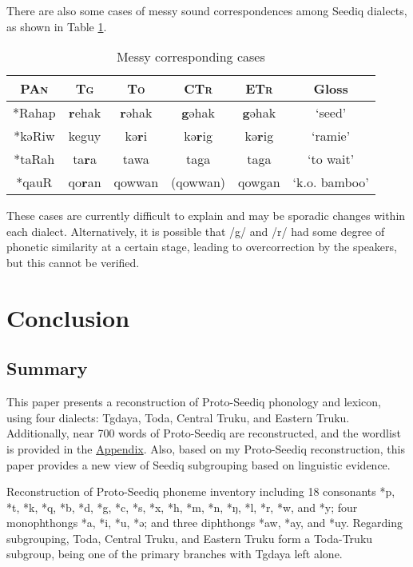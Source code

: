 \documentclass[12pt]{article}
\newcommand{\pan}{\textsc{PAn}\xspace}
\newcommand{\psedf}{Proto-Seediq\xspace}
\newcommand{\stg}{\textsc{Tg}\xspace}
\newcommand{\stgf}{Tgdaya\xspace}
\newcommand{\totrf}{Toda-Truku\xspace}
\newcommand{\sto}{\textsc{To}\xspace}
\newcommand{\stof}{Toda\xspace}
\newcommand{\sctr}{\textsc{CTr}\xspace}
\newcommand{\sctrf}{Central Truku\xspace}
\newcommand{\setr}{\textsc{ETr}\xspace}
\newcommand{\setrf}{Eastern Truku\xspace}
\begin{document}
There are also some cases of messy sound correspondences among Seediq dialects, as shown in Table \ref{tab:gr3}.

\begin{table}[!htbp]
\centering
\caption{Messy corresponding cases}
\label{tab:gr3}
\begin{tabular}{cccccc}
\hline
\pan   &  \stg  & \sto   & \sctr    & \setr  & Gloss         \\ \hline
*Rahap &  \textbf{r}ehak & \textbf{r}əhak  & \textbf{g}əhak    & \textbf{g}əhak  & `seed'        \\
*kəRiw &  keguy & kə\textbf{r}i   & kə\textbf{r}ig    & kə\textbf{r}ig  & `ramie'       \\
*taRah &  ta\textbf{r}a  & tawa   & taga     & taga   & `to wait'     \\
*qauR  &  qo\textbf{r}an & qowwan & (qowwan) & qowgan & `k.o. bamboo' \\ \hline
\end{tabular}
\end{table}

These cases are currently difficult to explain and may be sporadic changes within each dialect. Alternatively, it is possible that /g/ and /r/ had some degree of phonetic similarity at a certain stage, leading to overcorrection by the speakers, but this cannot be verified.

\section{Conclusion}

\subsection{Summary}

This paper presents a reconstruction of \psedf phonology and lexicon, using four dialects: \stgf, \stof, \sctrf, and \setrf. Additionally, near 700 words of \psedf are reconstructed, and the wordlist is provided in the \hyperref[wordlist]{Appendix}. Also, based on my \psedf reconstruction, this paper provides a new view of Seediq subgrouping based on linguistic evidence.

Reconstruction of \psedf phoneme inventory including 18 consonants *p, *t, *k, *q, *b, *d, *g, *c, *s, *x, *h, *m, *n, *ŋ, *l, *r, *w, and *y; four monophthongs *a, *i, *u, *ə; and three diphthongs *aw, *ay, and *uy. Regarding subgrouping, \stof, \sctrf, and \setrf form a \totrf subgroup, being one of the primary branches with \stgf left alone.
\end{document}
